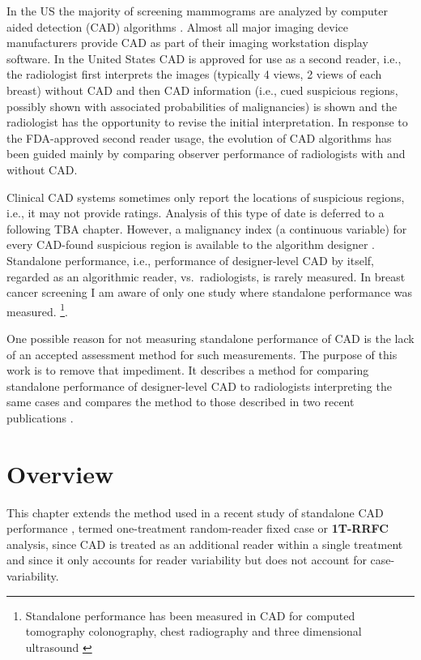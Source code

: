 \documentclass[
]{book}
\begin{document}
In the US the majority of screening mammograms are analyzed by computer aided detection (CAD) algorithms \citep{rao2010widely}. Almost all major imaging device manufacturers provide CAD as part of their imaging workstation display software. In the United States CAD is approved for use as a second reader, i.e., the radiologist first interprets the images (typically 4 views, 2 views of each breast) without CAD and then CAD information (i.e., cued suspicious regions, possibly shown with associated probabilities of malignancies) is shown and the radiologist has the opportunity to revise the initial interpretation. In response to the FDA-approved second reader usage, the evolution of CAD algorithms has been guided mainly by comparing observer performance of radiologists with and without CAD.

Clinical CAD systems sometimes only report the locations of suspicious regions, i.e., it may not provide ratings. Analysis of this type of date is deferred to a following TBA chapter. However, a malignancy index (a continuous variable) for every CAD-found suspicious region is available to the algorithm designer \citep{edwards2002maximum}. Standalone performance, i.e., performance of designer-level CAD by itself, regarded as an algorithmic reader, vs.~radiologists, is rarely measured. In breast cancer screening I am aware of only one study \citep{hupse2013standalone} where standalone performance was measured. \footnote{Standalone performance has been measured in CAD for computed tomography colonography, chest radiography and three dimensional ultrasound \citep{hein2010computeraided, summers2008performance, taylor2006computerassisted, deBoo2011computeraided, tan2012computeraided}}.

One possible reason for not measuring standalone performance of CAD is the lack of an accepted assessment method for such measurements. The purpose of this work is to remove that impediment. It describes a method for comparing standalone performance of designer-level CAD to radiologists interpreting the same cases and compares the method to those described in two recent publications \citep{hupse2013standalone, kooi2016comparison}.

\hypertarget{standalone-cad-radiologists-overview}{%
\section{Overview}\label{standalone-cad-radiologists-overview}}

This chapter extends the method used in a recent study of standalone CAD performance \citep{hupse2013standalone}, termed one-treatment random-reader fixed case or \textbf{1T-RRFC} analysis, since CAD is treated as an additional reader within a single treatment and since it only accounts for reader variability but does not account for case-variability.
\end{document}
